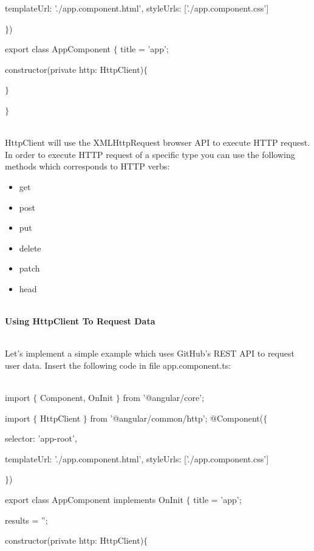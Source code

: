 \documentclass{article}
\begin{document}
\noindent templateUrl: './app.component.html', styleUrls: ['./app.component.css']

\noindent $\mathrm{\}}$)

\noindent export class AppComponent $\mathrm{\{}$ title = 'app';

\noindent constructor(private http: HttpClient)$\mathrm{\{}$

\noindent $\mathrm{\}}$

\noindent $\mathrm{\}}$

\noindent 

\noindent \\ HttpClient will use the XMLHttpRequest browser API to execute HTTP request. In order to execute HTTP request of a specific type you can use the following methods which corresponds to HTTP verbs:

 
 \begin{itemize}
 	\item get
 	\item post
 	\item put
 	\item delete
 	\item patch
 	\item head
 \end{itemize}
     
\newpage

\noindent \\ \textbf{Using HttpClient To Request Data}

\noindent \\ Let's implement a simple example which uses GitHub's REST API to request user data. Insert the following code in file app.component.ts:

\noindent \\ import $\mathrm{\{}$ Component, OnInit $\mathrm{\}}$ from '@angular/core'; 

\noindent import $\mathrm{\{}$ HttpClient $\mathrm{\}}$ from '@angular/common/http'; @Component($\mathrm{\{}$

\noindent selector: 'app-root',

\noindent templateUrl: './app.component.html', styleUrls: ['./app.component.css']

\noindent $\mathrm{\}}$)

\noindent export class AppComponent implements OnInit $\mathrm{\{}$ title = 'app';

\noindent results = '';

\noindent constructor(private http: HttpClient)$\mathrm{\{}$
\end{document}
